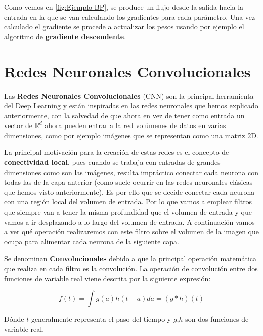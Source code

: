             \noindent Como vemos en \autoref{fig:Ejemplo BP}, se produce un flujo desde la salida hacia la entrada en la que se van calculando los gradientes para cada parámetro. Una vez calculado el gradiente se procede a actualizar los pesos usando por ejemplo el algoritmo de \textbf{gradiente descendente}.
        
    \section{Redes Neuronales Convolucionales}
        \noindent Las \textbf{Redes Neuronales Convolucionales} (CNN) son la principal herramienta del Deep Learning y están inspiradas en las redes neuronales que hemos explicado anteriormente, con la salvedad de que ahora en vez de tener como entrada un vector de $\mathbb{R}^d$ ahora pueden entrar a la red volúmenes de datos en varias dimensiones, como por ejemplo imágenes que se representan como una matriz $2$D.
        
        \medskip

        \noindent La principal motivación para la creación de estas redes es el concepto de \textbf{conectividad local}, pues cuando se trabaja con entradas de grandes dimensiones como son las imágenes, resulta impráctico conectar cada neurona con todas las de la capa anterior (como suele ocurrir en las redes neuronales clásicas que hemos visto anteriormente). Es por ello que se decide conectar cada neurona con una región local del volumen de entrada. Por lo que vamos a emplear filtros que siempre van a tener la misma profundidad que el volumen de entrada y que vamos a ir desplazando a lo largo del volumen de entrada. A continuación vamos a ver qué operación realizaremos con este filtro sobre el volumen de la imagen que ocupa para alimentar cada neurona de la siguiente capa.

        \medskip

        \noindent Se denominan \textbf{Convolucionales} debido a que la principal operación matemática que realiza en cada filtro es la convolución. La operación de convolución entre dos funciones de variable real viene descrita por la siguiente expresión:

        \begin{equation}
            f(t)=\int g(a) h(t-a) da = (g \ast h)(t)
        \end{equation}

        \noindent Dónde $t$ generalmente representa el paso del tiempo y $g$,$h$ son dos funciones de variable real.

